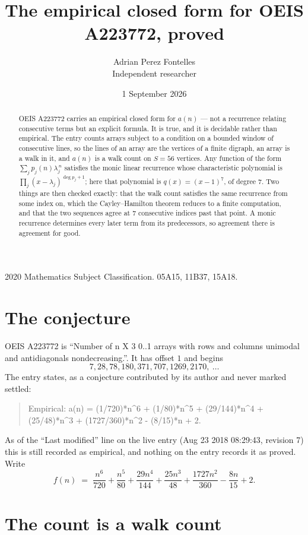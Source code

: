 \documentclass[11pt,a4paper]{article}
\title{The empirical closed form for OEIS A223772, proved}
\author{Adrian Perez Fontelles\\ \small Independent researcher}
\date{1 September 2026}
\theoremstyle{plain}
\theoremstyle{definition}
\begin{document}
\maketitle

\begin{abstract}
OEIS A223772 carries an empirical closed form for $a(n)$ --- not a recurrence relating
consecutive terms but an explicit formula. It is true, and it is decidable rather than
empirical. The entry counts arrays subject to a condition on a bounded window of consecutive lines, so the lines of an array are the
vertices of a finite digraph, an array is a walk in it, and $a(n)$ is a walk count on
$S=56$ vertices. Any function of the form $\sum_j p_j(n)\lambda_j^{\,n}$ satisfies the
monic linear recurrence whose characteristic polynomial is
$\prod_j(x-\lambda_j)^{\deg p_j+1}$; here that polynomial is $q(x)=(x-1)^{7}$, of degree
$7$. Two things are then checked exactly: that the walk count satisfies the same
recurrence from some index on, which the Cayley--Hamilton theorem reduces to a finite
computation, and that the two sequences agree at $7$ consecutive indices past that
point. A monic recurrence determines every later term from its predecessors, so agreement
there is agreement for good.
\end{abstract}

\noindent\small 2020 Mathematics Subject Classification. 05A15, 11B37, 15A18.\normalsize

\section{The conjecture}

OEIS A223772 is ``Number of n X 3 0..1 arrays with rows and columns unimodal and antidiagonals nondecreasing.''. It has offset $1$ and begins
\[
7, 28, 78, 180, 371, 707, 1269, 2170,\ \dots
\]
The entry states, as a conjecture contributed by its author and never marked settled:
\begin{quote}
Empirical: a(n) = (1/720)*n\^{}6 + (1/80)*n\^{}5 + (29/144)*n\^{}4 + (25/48)*n\^{}3 + (1727/360)*n\^{}2 - (8/15)*n + 2.
\end{quote}
As of the ``Last modified'' line on the live entry (Aug 23 2018 08:29:43, revision 7) this is still
recorded as empirical, and nothing on the entry records it as proved. Write
\[
f(n)\;=\;\frac{n^{6}}{720} + \frac{n^{5}}{80} + \frac{29 n^{4}}{144} + \frac{25 n^{3}}{48} + \frac{1727 n^{2}}{360} - \frac{8 n}{15} + 2.
\]

\section{The count is a walk count}
\end{document}
